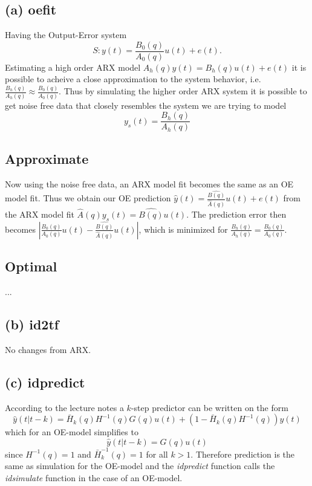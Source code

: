 \documentclass[]{article}
\begin{document}
\subsection{(a) oefit}
Having the Output-Error system
\begin{equation}
	S: y(t) = \frac{B_0(q)}{A_0(q)}u(t) + e(t).
\end{equation}
Estimating a high order ARX model $A_h(q)y(t) = B_h(q)u(t) + e(t)$ it is possible to acheive a close approximation to the system behavior, i.e. $\frac{B_h(q)}{A_h(q)} \approx \frac{B_0(q)}{A_0(q)}$. Thus by simulating the higher order ARX system it is possible to get noise free data that closely resembles the system we are trying to model
\begin{equation}
	y_s(t) = \frac{B_h(q)}{A_h(q)}
\end{equation}

\subsection{Approximate}
Now using the noise free data, an ARX model fit becomes the same as an OE model fit. Thus we obtain our OE prediction $\hat{y}(t) = \frac{\hat{B(q)}}{\hat{A}(q)}u(t) + e(t)$ from the ARX model fit $\hat{A}(q)y_s(t) = \hat{B(q)}u(t)$. The prediction error then becomes $| \frac{B_0(q)}{A_0(q)}u(t) - \frac{\hat{B(q)}}{\hat{A}(q)}u(t)|$, which is minimized for $\frac{B_h(q)}{A_h(q)} = \frac{B_0(q)}{A_0(q)}$.

\subsection{Optimal}
...

\subsection{(b) id2tf}
No changes from ARX.

\subsection{(c) idpredict}
According to the lecture notes a $k$-step predictor can be written on the form
\begin{equation}
	\label{eq:K-step Prediction}
	\hat{y}(t|t-k) = \bar{H}_k(q)H^{-1}(q)G(q)u(t) + (1-\bar{H}_k(q)H^{-1}(q))y(t)
\end{equation}
which for an OE-model simplifies to
\begin{equation}
	\label{eq:K-step Prediction OE}
	\hat{y}(t|t-k) = G(q)u(t)
\end{equation}
since $H^{-1}(q)=1$ and $\bar{H}_k^{-1}(q)=1$ for all $k > 1$. Therefore prediction is the same as simulation for the OE-model and the \emph{idpredict} function calls the \emph{idsimulate} function in the case of an OE-model.
\end{document}
